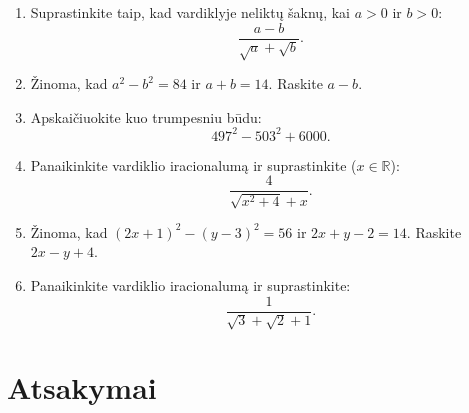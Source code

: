 \documentclass[11pt,a4paper]{article}
\begin{document}
\begin{enumerate}
\item Suprastinkite taip, kad vardiklyje neliktų šaknų, kai \(a>0\) ir \(b>0\):\[\frac{a-b}{\sqrt a+\sqrt b}.\]
\item Žinoma, kad \(a^2-b^2=84\) ir \(a+b=14\). Raskite \(a-b\).
\item Apskaičiuokite kuo trumpesniu būdu:\[497^2-503^2+6000.\]
\item Panaikinkite vardiklio iracionalumą ir suprastinkite (\(x\in\mathbb R\)):\[\frac4{\sqrt{x^2+4}+x}.\]
\item Žinoma, kad \((2x+1)^2-(y-3)^2=56\) ir \(2x+y-2=14\). Raskite \(2x-y+4\).
\item Panaikinkite vardiklio iracionalumą ir suprastinkite:\[\frac1{\sqrt3+\sqrt2+1}.\]
\end{enumerate}
\clearpage
\section*{Atsakymai}
\end{document}
